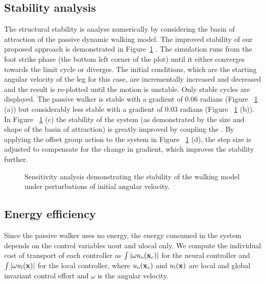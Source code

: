 \subsection{Stability analysis}

The structural stability is analyse numerically by considering the basin of attraction of the passive dynamic walking model.
The improved stability of our proposed approach is demonstrated in Figure~\ref{fig:boa_plot} . 
The simulation runs from the foot strike phase (the bottom left corner of the plot) until it either converges towards the limit cycle or diverges.
The initial conditions, which are the starting angular velocity of the leg for this case, are incrementally increased and decreased and the result is re-plotted until the motion is unstable. 
Only stable cycles are displayed.
The passive walker is stable with a gradient of 0.06 radians (Figure ~\ref{fig:boa_plot} (a)) but considerably less stable with a gradient of 0.03 radians (Figure ~\ref{fig:boa_plot} (b)). 
In Figure ~\ref{fig:boa_plot} (c) the stability of the system (as demonstrated by the size and shape of the basin of attraction) is greatly improved by coupling the \cpg. 
By applying the offset group action to the system in Figure ~\ref{fig:boa_plot} (d), the step size is adjusted to compensate for the change in gradient, which improves the stability further.

\begin{figure}[htbp]
\centering
{}
\caption{\label{fig:boa_plot}Sensitivity analysis demonstrating the stability of the walking model under perturbations of initial angular velocity.}
\end{figure}

 
\subsection{Energy efficiency}
Since the passive walker uses no energy, the energy consumed in the system depends on the control variables uout  and ulocal only. 
We compute the individual cost of transport \citep{collins05a} of each controller as $\int|\omega u_{\mathrm{o}}(\mathbf{x}_c)|$ for the neural controller and $\int|\omega u_{\mathrm{l}}(\mathbf{x})|$ for the local controller, where $u_{\mathrm{o}}(\mathbf{x}_c)$ and $u_{\mathrm{l}}(\mathbf{x})$ are local and global invariant control effort and $\omega$ is the angular velocity. 

